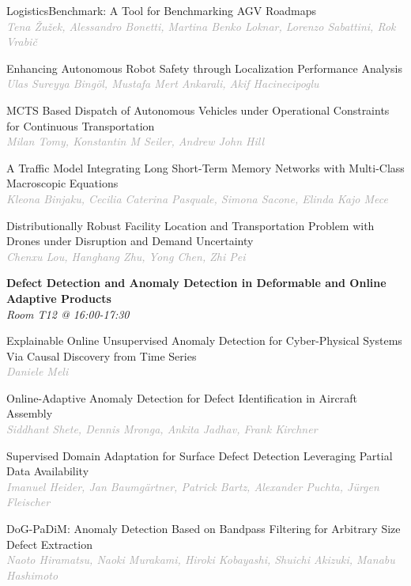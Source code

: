 \begin{multicols*}{2}
\small LogisticsBenchmark: A Tool for Benchmarking AGV Roadmaps\\ 
\footnotesize \textcolor{darkgray}{\textit{Tena Žužek, Alessandro  Bonetti, Martina  Benko Loknar, Lorenzo  Sabattini, Rok Vrabič}}

\small Enhancing Autonomous Robot Safety through Localization Performance Analysis\\ 
\footnotesize \textcolor{darkgray}{\textit{Ulas Sureyya Bingöl, Mustafa Mert  Ankarali, Akif  Hacinecipoglu}}

\small MCTS Based Dispatch of Autonomous Vehicles under Operational Constraints for Continuous Transportation\\ 
\footnotesize \textcolor{darkgray}{\textit{Milan Tomy, Konstantin M  Seiler, Andrew John  Hill}}

\small A Traffic Model Integrating Long Short-Term Memory Networks with Multi-Class Macroscopic Equations\\ 
\footnotesize \textcolor{darkgray}{\textit{Kleona Binjaku, Cecilia Caterina  Pasquale, Simona  Sacone, Elinda  Kajo Mece}}

\small Distributionally Robust Facility Location and Transportation Problem with Drones under Disruption and Demand Uncertainty\\ 
\footnotesize \textcolor{darkgray}{\textit{Chenxu Lou, Hanghang  Zhu, Yong  Chen, Zhi  Pei}}

\normalsize \textbf{Defect Detection and Anomaly Detection in Deformable and Online Adaptive Products}\\
\small \textit{Room T12 @ 16:00-17:30}

\small Explainable Online Unsupervised Anomaly Detection for Cyber-Physical Systems Via Causal Discovery from Time Series\\ 
\footnotesize \textcolor{darkgray}{\textit{Daniele Meli}}

\small Online-Adaptive Anomaly Detection for Defect Identification in Aircraft Assembly\\ 
\footnotesize \textcolor{darkgray}{\textit{Siddhant Shete, Dennis  Mronga, Ankita  Jadhav, Frank  Kirchner}}

\small Supervised Domain Adaptation for Surface Defect Detection Leveraging Partial Data Availability\\ 
\footnotesize \textcolor{darkgray}{\textit{Imanuel Heider, Jan  Baumgärtner, Patrick  Bartz, Alexander  Puchta, Jürgen  Fleischer}}

\small DoG-PaDiM: Anomaly Detection Based on Bandpass Filtering for Arbitrary Size Defect Extraction\\ 
\footnotesize \textcolor{darkgray}{\textit{Naoto Hiramatsu, Naoki  Murakami, Hiroki  Kobayashi, Shuichi  Akizuki, Manabu  Hashimoto}}


\end{multicols*}
